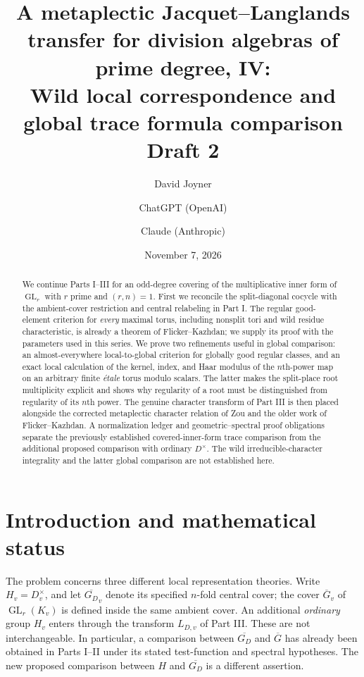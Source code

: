 \documentclass[11pt]{article}
\title{A metaplectic Jacquet--Langlands transfer for division algebras of prime degree, IV:\\
Wild local correspondence and global trace formula comparison\\[0.4em]\normalsize Draft 2}
\author{David Joyner \and ChatGPT (OpenAI) \and Claude (Anthropic)}
\date{November 7, 2026}
\newcommand{\GL}{\operatorname{GL}}
\newcommand{\Gb}{\overline G}
\newcommand{\GDb}{\overline{G_D}}
\theoremstyle{plain}
\theoremstyle{definition}
\begin{document}
\maketitle
\begin{abstract}
We continue Parts I--III for an odd-degree covering of the multiplicative
inner form of $\GL_r$ with $r$ prime and $(r,n)=1$.  First we reconcile the
split-diagonal cocycle with the ambient-cover restriction and central
relabeling in Part I.  The regular good-element criterion for \emph{every}
maximal torus, including nonsplit tori and wild residue characteristic,
is already a theorem of Flicker--Kazhdan; we supply its proof with the
parameters used in this series.  We prove two refinements useful in global
comparison: an almost-everywhere local-to-global criterion for globally
good regular classes, and an exact local calculation of the kernel, index,
and Haar modulus of the $n$th-power map on an arbitrary finite \emph{\'etale}
torus modulo scalars.  The latter makes the split-place root multiplicity
explicit and shows why regularity of a root must be distinguished from
regularity of its $n$th power.  The genuine character transform of Part III
is then placed alongside the corrected metaplectic character relation of
Zou and the older work of Flicker--Kazhdan.  A normalization ledger and
geometric--spectral proof obligations separate the previously established
covered-inner-form trace comparison from the additional proposed
comparison with ordinary $D^\times$.  The wild irreducible-character
integrality and the latter global comparison are not established here.
\end{abstract}
\tableofcontents

\section{Introduction and mathematical status}\label{sec:intro}
The problem concerns three different local representation theories.
Write $H_v=D_v^\times$, and let $\GDb_v$ denote its specified $n$-fold
central cover; the cover $\Gb_v$ of $\GL_r(K_v)$ is defined inside the
same ambient cover.  An additional \emph{ordinary} group $H_v$ enters
through the transform $L_{D,v}$ of Part III.  These are not interchangeable.
In particular, a comparison between $\GDb$ and $\Gb$ has already been
obtained in Parts I--II under its stated test-function and spectral
hypotheses.  The new proposed comparison between $H$ and $\GDb$ is a
different assertion.
\end{document}
